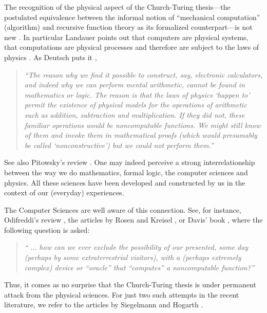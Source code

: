 The recognition of the physical aspect of the Church-Turing thesis---the
postulated equivalence between the informal notion of ``mechanical
computation'' (algorithm) and recursive function theory as its formalized
counterpart---is not new
\cite{scilard-col,brillouin1,brillouin2,maxwell-demon,rogers1,odi:89}. In particular
Landauer
points out that computers are physical systems, that computations are
physical processes and therefore are subject to the laws of physics
\cite{landauer:61,landauer-67,landauer:82,landauer-87,landauer-88,landauer-89,landauer,landauer-94,landauer-95}.
 As Deutsch puts it \cite[p. 101]{deutsch},
 \begin{quote}
 {\em
 ``The reason why we find it possible to construct, say, electronic
 calculators, and indeed why we can perform mental arithmetic, cannot
 be found in mathematics or logic. {\em
 The reason is that the laws of physics `happen to' permit the
 existence of physical models for the operations of arithmetic}
 such as addition, subtraction and multiplication.
 If they did not, these familiar operations would be
 noncomputable functions. We might still
 know {\em of} them and invoke them in mathematical proofs
 (which would presumably be called `nonconstructive') but we could
 not perform them.''
 }
 \end{quote}
See also Pitowsky's review \cite{pit:90}.
One may indeed perceive a strong interrelationship between the way we do
mathematics, formal logic, the computer sciences and physics. All these
sciences have been developed and constructed by us in the context of our
(everyday) experiences.

The Computer Sciences are well aware of this
connection. See, for instance,
Odifreddi's review
\cite{odi:89}, the articles by
 Rosen \cite{rosen} and Kreisel \cite{kreisel},
 or
 Davis'
 book \cite[p. 11]{davis-58}, where the following question is
asked:
 \begin{quote}
 {\em `` $\ldots$ how can we ever exclude the possibility of our
 presented,
 some day (perhaps by some extraterrestrial visitors), with a (perhaps
 extremely complex) device or ``oracle'' that ``computes'' a
 noncomputable function?''
 }
 \end{quote}

Thus, it comes as no surprise that the Church-Turing thesis is under
permanent attack from the physical sciences. For just two such attempts
in the recent literature, we refer to the articles by Siegelmann
\cite{siegel95} and Hogarth \cite{hogarth1,hogarth2}.

